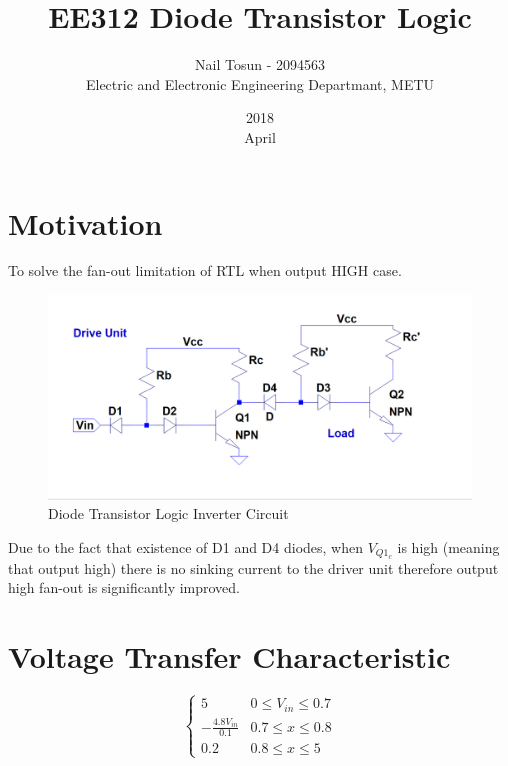 \documentclass[11pt]{report}
\title{EE312 Diode Transistor Logic}
\date{2018\\ April}
\author{Nail Tosun - 2094563\\ Electric and Electronic Engineering Departmant, METU}
\begin{document}
\maketitle
\section*{Motivation}
To solve the fan-out limitation of RTL when output HIGH case.
\begin{figure}[H]
  \includegraphics[width=\linewidth]{dtl}
  \caption{Diode Transistor Logic Inverter Circuit}
  \label{fig:zero}
\end{figure}
Due to the fact that existence of D1 and D4 diodes, when $V_{Q1_c}$ is high (meaning that output high) there is no sinking current to the driver unit therefore output high fan-out is significantly improved. 
\section*{Voltage Transfer Characteristic}
\[ \begin{cases} 
      5 & 0 \leq V_{in}\leq 0.7 \\
      -\frac{4.8V_{in}}{0.1} & 0.7 \leq x\leq 0.8 \\
      0.2 & 0.8 \leq x \leq 5 
   \end{cases}
\]
\end{document}
